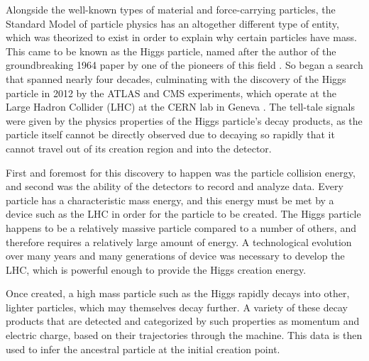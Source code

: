 \documentclass          {article} %
\begin{document}
Alongside the well-known types of material and force-carrying particles, the Standard Model of particle physics has an altogether different type of entity, which was theorized to exist in order to explain why certain particles have mass. This came to be known as the Higgs particle, named after the author of the groundbreaking 1964 paper by one of the pioneers of this field \cite{???}. So began a search that spanned nearly four decades, culminating with the discovery of the Higgs particle in 2012 by the ATLAS and CMS experiments, which operate at the Large Hadron Collider (LHC) at the CERN lab in Geneva \cite{???}. The tell-tale signals were given by the physics properties of the Higgs particle's decay products, as the particle itself cannot be directly observed due to decaying so rapidly that it cannot travel out of its creation region and into the detector.

First and foremost for this discovery to happen was the particle collision energy, and second was the ability of the detectors to record and analyze data. Every particle has a characteristic mass energy, and this energy must be met by a device such as the LHC in order for the particle to be created. The Higgs particle happens to be a relatively massive particle compared to a number of others, and therefore requires a relatively large amount of energy. A technological evolution over many years and many generations of device was necessary to develop the LHC, which is powerful enough to provide the Higgs creation energy.

Once created, a high mass particle such as the Higgs rapidly decays into other, lighter particles, which may themselves decay further. A variety of these decay products that are detected and categorized by such properties as momentum and electric charge, based on their trajectories through the machine. This data is then used to infer the ancestral particle at the initial creation point.
\end{document}
